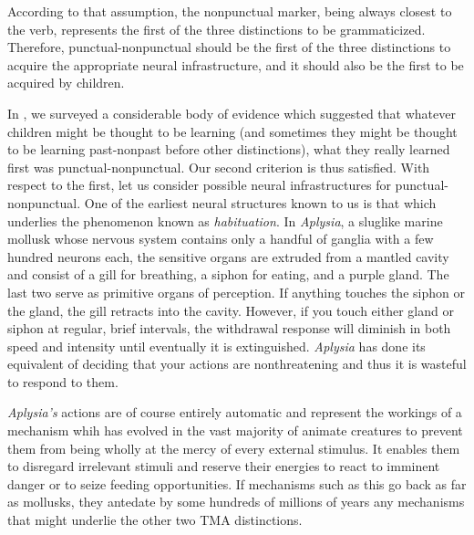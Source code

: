 According to that assumption, the nonpunctual marker, being always closest to the verb, represents the first of the three distinctions to be grammaticized. Therefore, punctual-nonpunctual should be the first of the three distinctions to acquire the appropriate neural infrastructure, and it should also be the first to be acquired by children.

In , we surveyed a considerable body of evidence which suggested that whatever children might be thought to be learning (and sometimes they might be thought to be learning past-nonpast before other distinctions), what they really learned first was punctual-nonpunctual. Our second criterion is thus satisfied. With respect to the first, let us consider possible neural infrastructures for punctual-nonpunctual. One of the earliest neural structures known to us is that which underlies the phenomenon known as \textit{habituation}. In \textit{Aplysia}, a sluglike marine mollusk whose nervous system contains only a handful of ganglia with a few hundred neurons each, the sensitive organs are extruded from a mantled cavity and consist of a gill for breathing, a siphon for eating, and a purple gland. The last two serve as primitive organs of perception. If anything touches the siphon or the gland, the gill retracts into the cavity. However, if you touch either gland or siphon at regular, brief intervals, the withdrawal response will diminish in both speed and intensity until eventually it is extinguished. \textit{Aplysia} has done its equivalent of deciding that your actions are nonthreatening and thus it is wasteful to respond to them.

\textit{Aplysia's} actions are of course entirely automatic and represent the workings of a mechanism whih has evolved in the vast majority of
animate creatures to prevent them from being wholly at the mercy of every external stimulus. It enables them to disregard irrelevant stimuli and reserve their energies to react to imminent danger or to seize feeding opportunities. If mechanisms such as this go back as far as mollusks, they antedate by some hundreds of millions of years any mechanisms that might underlie the other two TMA distinctions.

